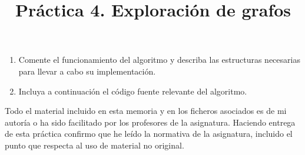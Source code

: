 \documentclass[]{article}
\title{Práctica 4. Exploración de grafos}
\author{}
\begin{document}
\maketitle


%

\begin{enumerate}
\item Comente el funcionamiento del algoritmo y describa las estructuras necesarias para llevar a cabo su implementación.



\item Incluya a continuación el código fuente relevante del algoritmo.




\end{enumerate}

Todo el material incluido en esta memoria y en los ficheros asociados es de mi autoría o ha sido facilitado por los profesores de la asignatura. Haciendo entrega de esta práctica confirmo que he leído la normativa de la asignatura, incluido el punto que respecta al uso de material no original.
\end{document}
